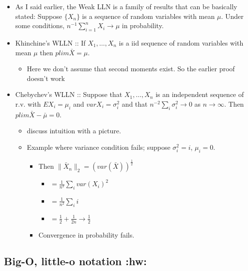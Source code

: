 \documentclass[11pt]{article}
\begin{document}
\begin{itemize}
\item As I said earlier, the Weak LLN is a family of results that can
       be basically stated: Suppose $\{X_n\}$ is a sequence of random
       variables with mean $\mu$.  Under some conditions, $n^{-1}
       \sum_{i=1}^n X_i \to \mu$ in probability.
\item Khinchine's WLLN :: If $X_1,\dots,X_n$ is a iid sequence of
          random variables with mean $\mu$ then $plim \bar X = \mu$.
\begin{itemize}
\item Here we don't assume that second moments exist.  So the earlier
         proof doesn't work
\end{itemize}
\item Chebychev's WLLN :: Suppose that $X_1,\dots,X_n$ is an
          independent sequence of r.v. with $E X_i = \mu_i$ and $var
          X_i = \sigma_i^2$ and that $n^{-2} \sum_i \sigma_i^2 \to 0$
          as $n \to \infty$.  Then $plim \bar X - \bar \mu = 0$.
\begin{itemize}
\item discuss intuition with a picture.
\item Example where variance condition fails; suppose $\sigma_i^2 = i$, $\mu_i = 0$.
\begin{itemize}
\item Then $\|\bar X_n\|_2 = (var(\bar X))^{\frac12}$
\begin{itemize}
\item $= \frac{1}{n^2} \sum_i var(X_i)^2$
\item $= \frac{1}{n^2} \sum_i i$
\item $= \frac12 + \frac{1}{2n} \to \frac{1}{2}$
\end{itemize}
\item Convergence in probability fails.
\end{itemize}
\end{itemize}
\end{itemize}
\subsection{Big-O, little-o notation \textbf{:hw:}}
\label{sec-1-4}
\end{document}
